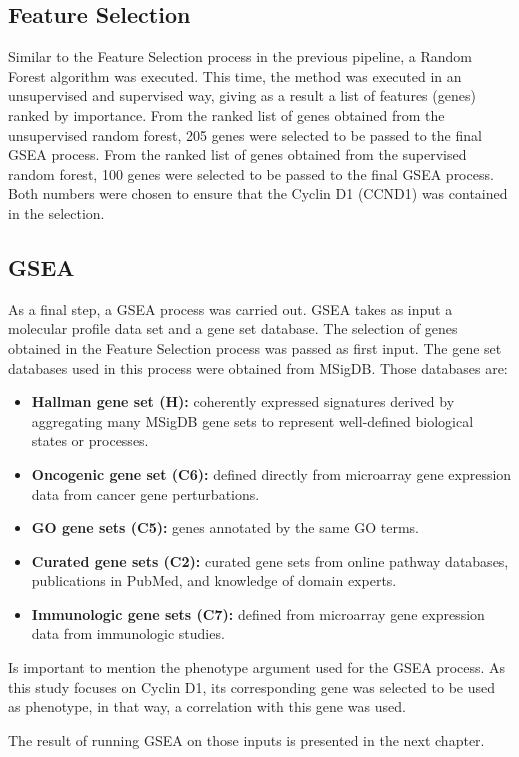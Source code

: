 \subsection{Feature Selection}
Similar to the Feature Selection process in the previous pipeline, a Random Forest algorithm was executed.
This time, the method was executed in an unsupervised and supervised way, giving as a result a list of features (genes) ranked by importance.
From the ranked list of genes obtained from the unsupervised random forest, 205 genes were selected to be passed to the final GSEA process.
From the ranked list of genes obtained from the supervised random forest, 100 genes were selected to be passed to the final GSEA process.
Both numbers were chosen to ensure that the Cyclin D1 (CCND1) was contained in the selection.

\subsection{GSEA}

As a final step, a GSEA process was carried out.
GSEA takes as input a molecular profile data set and a gene set database.
The selection of genes obtained in the Feature Selection process was passed as first input. The gene set databases used in this process were obtained from MSigDB. Those databases are:

\begin{itemize}
    \item \textbf{Hallman gene set (H):} coherently expressed signatures derived by aggregating many MSigDB gene sets to represent well-defined biological states or processes.
    \item \textbf{Oncogenic gene set (C6):} defined directly from microarray gene expression data from cancer gene perturbations.
    \item \textbf{GO gene sets (C5):} genes annotated by the same GO terms.
    \item \textbf{Curated gene sets (C2):} curated gene sets from online pathway databases, publications in PubMed, and knowledge of domain experts.
    \item \textbf{Immunologic gene sets (C7):} defined from microarray gene expression data from immunologic studies.
\end{itemize}

Is important to mention the phenotype argument used for the GSEA process.
As this study focuses on Cyclin D1, its corresponding gene was selected to be used as phenotype, in that way, a correlation with this gene was used.

The result of running GSEA on those inputs is presented in the next chapter.